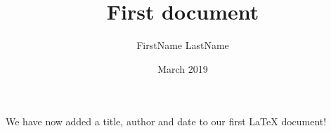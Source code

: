 \documentclass[12pt]{article}
\title{First document}
\author{FirstName LastName}
\date{March 2019}
\begin{document}
 
	\maketitle
	We have now added a title, author and date to our first \LaTeX{} document!

\end{document}
